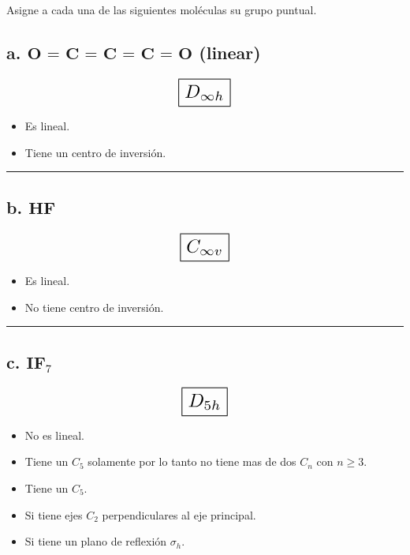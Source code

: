 \renewcommand{\labelitemi}{$\bullet$}

Asigne a cada una de las siguientes moléculas su grupo puntual.


\subsection*{a. $\textbf{O = C = C = C = O}$ (linear)}

\[ \scalebox{1.7}{$\boxed{D_{\infty h}}$} \]

\begin{itemize}
    \item Es lineal.
    \item Tiene un centro de inversión.
\end{itemize}

\iffalse
Es lineal.
Tiene un centro de inversión.

D_inf_h
\fi

\begin{center}
    \rule{15cm}{0.4pt}
\end{center}


\subsection*{b. $\textbf{HF}$}

\[ \scalebox{1.7}{$\boxed{C_{\infty v}}$} \]

\begin{itemize}
    \item Es lineal.
    \item No tiene centro de inversión.
\end{itemize}

\iffalse
Es lineal.
No tiene centro de inversión.

C_inf_v
\fi

\begin{center}
    \rule{15cm}{0.4pt}
\end{center}


\subsection*{c. $\textbf{IF}_7$}

\[ \scalebox{1.7}{$\boxed{D_{5h}}$} \]

\begin{itemize}
    \item No es lineal.
    \item Tiene un $C_5$ solamente por lo tanto no tiene mas de dos $C_n$ con $n \geq 3$.
    \item Tiene un $C_5$.
    \item Si tiene ejes $C_2$ perpendiculares al eje principal.
    \item Si tiene un plano de reflexión $\sigma_h$.
\end{itemize}

